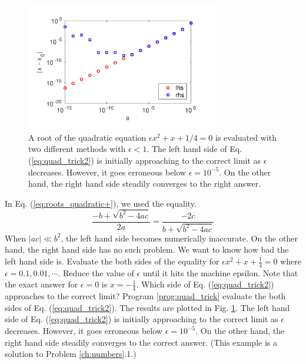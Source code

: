 \begin{example}\label{ex:roots_quadratic}

\begin{figure}
\centering
\includegraphics[width=3.3in]{04.root-finding/quadratic_root.pdf}
\caption{A root of the quadratic equation $\epsilon x^2+x+1/4=0$ is evaluated with two different methods with $\epsilon<1$. The left hand side of Eq. (\ref{eq:quad_trick2}) is initially approaching to the correct limit as $\epsilon$ decreases.  However, it goes erroneous below $\epsilon=10^{-5}$.  On the other hand, the right hand side steadily converges to the right answer.}
\label{fig:quadratic_root}
\end{figure}

\medskip
\noindent

In Eq. (\ref{eq:roots_quadratic+}), we used the equality.
\begin{equation}\label{eq:quad_trick2}
\frac{-b + \sqrt{b^2 - 4 a c}}{2a} = \frac{-2c}{b+\sqrt{b^2 - 4 a c}}
\end{equation}
When $|ac| \ll b^2$, the left hand side becomes numerically inaccurate.  On the other hand, the right hand side has no such problem.
We want to know how bad the left hand side is.  
Evaluate the both sides of the equality for $\epsilon x^2 + x + \displaystyle\frac{1}{4} = 0$ where $\epsilon = 0.1, 0.01, \cdots$. Reduce the value of $\epsilon$ until it hits the machine epsilon. Note that the exact answer for $\epsilon=0$ is $x=-\displaystyle\frac{1}{4}$.  Which side of Eq. (\ref{eq:quad_trick2}) approaches to the correct limit?  Program \ref{prog:quad_trick} evaluate the both sides of Eq. (\ref{eq:quad_trick2}). The results are plotted in Fig. \ref{fig:quadratic_root}.  The left hand side of Eq. (\ref{eq:quad_trick2}) is initially approaching to the correct limit as $\epsilon$ decreases.  However, it goes erroneous below $\epsilon=10^{-5}$.  On the other hand, the right hand side 
steadily converges to the correct answer.   (This example is a solution to Problem \ref{ch:numbers}.1.)
\end{example}

